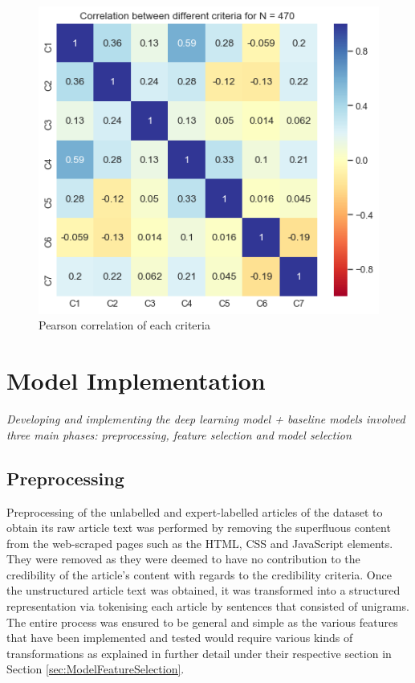 \documentclass[a4paper,twoside,phd]{BYUPhys}
\begin{document}
\begin{figure}[!htb]
	\centering
	\includegraphics[totalheight=8cm]{images/criteria-correlation.png}
	\caption{Pearson correlation of each criteria}
	\label{fig:CriteriaCorrelation}
\end{figure}



\section{Model Implementation}
\label{sec:SystemModel}

\textit{Developing and implementing the deep learning model + baseline models involved three main phases: preprocessing, feature selection and model selection}

\subsection{Preprocessing}
\label{sec:ModelPreprocessing}

Preprocessing of the unlabelled and expert-labelled articles of the dataset to obtain its raw article text was performed by removing the superfluous content from the web-scraped pages such as the HTML, CSS and JavaScript elements. They were removed as they were deemed to have no contribution to the credibility of the article's content with regards to the credibility criteria. Once the unstructured article text was obtained, it was transformed into a structured representation via tokenising each article by sentences that consisted of unigrams. The entire process was ensured to be general and simple as the various features that have been implemented and tested would require various kinds of transformations as explained in further detail under their respective section in Section \ref{sec:ModelFeatureSelection}.
\end{document}
